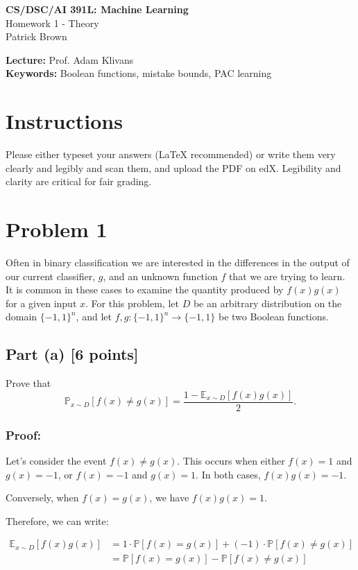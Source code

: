 \documentclass{article}
\begin{document}
\begin{center}
    \Large\textbf{CS/DSC/AI 391L: Machine Learning}\\
    \large Homework 1 - Theory\\
    \normalsize Patrick Brown
\end{center}

\noindent\textbf{Lecture:} Prof. Adam Klivans\\
\textbf{Keywords:} Boolean functions, mistake bounds, PAC learning

\vspace{1cm}

\section*{Instructions}
Please either typeset your answers (\LaTeX{} recommended) or write them very clearly and legibly and scan them, and upload the PDF on edX. Legibility and clarity are critical for fair grading.

\section*{Problem 1}
Often in binary classification we are interested in the differences in the output of our current classifier, $g$, and an unknown function $f$ that we are trying to learn. It is common in these cases to examine the quantity produced by $f(x)g(x)$ for a given input $x$. For this problem, let $D$ be an arbitrary distribution on the domain $\{-1,1\}^n$, and let $f,g: \{-1,1\}^n \to \{-1,1\}$ be two Boolean functions.

\subsection*{Part (a) [6 points]}
Prove that
\[\mathbb{P}_{x\sim D}[f(x) \neq g(x)] = \frac{1 - \mathbb{E}_{x\sim D}[f(x)g(x)]}{2}.\]

\subsubsection*{Proof:}
Let's consider the event $f(x) \neq g(x)$. This occurs when either $f(x) = 1$ and $g(x) = -1$, or $f(x) = -1$ and $g(x) = 1$. In both cases, $f(x)g(x) = -1$.

Conversely, when $f(x) = g(x)$, we have $f(x)g(x) = 1$.

Therefore, we can write:

\begin{align*}
\mathbb{E}_{x\sim D}[f(x)g(x)] &= 1 \cdot \mathbb{P}[f(x) = g(x)] + (-1) \cdot \mathbb{P}[f(x) \neq g(x)] \\
&= \mathbb{P}[f(x) = g(x)] - \mathbb{P}[f(x) \neq g(x)]
\end{align*}
\end{document}
